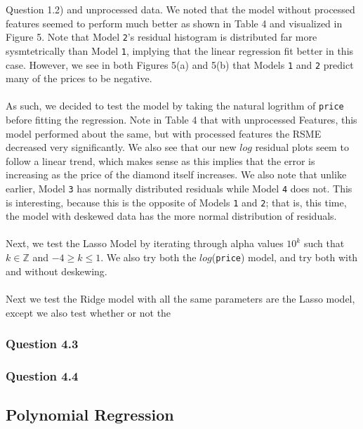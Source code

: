 \documentclass[11pt,letterpaper]{article}
\begin{document}
Question 1.2) and unprocessed data. We noted that the model without processed features
seemed to perform much better as shown in Table 4 and visualized in Figure 5. Note that
Model \texttt{2}'s residual histogram is distributed far more sysmtetrically than 
Model \texttt{1}, implying that the linear regression fit better in this case.
However, we see in both Figures 5(a) and 5(b) that Models \texttt{1} and \texttt{2} 
predict many of the prices to be negative. \\\\
As such, we decided to test the model by taking the natural logrithm of 
\texttt{price} before fitting the regression. Note in Table 4 that with unprocessed 
Features, this model performed about the same, but with processed features the RSME 
decreased very significantly. We also see that our new $log$ residual plots seem to 
follow a linear trend, which makes sense as this implies that the error is increasing
as the price of the diamond itself increases. We also note that unlike earlier, Model
\texttt{3} has normally distributed residuals while Model \texttt{4} does not. This is
interesting, because this is the opposite of Models \texttt{1} and \texttt{2}; that is,
this time, the model with deskewed data has the more normal distribution of residuals.\\\\

Next, we test the Lasso Model by iterating through alpha values $10^k$ such that 
$k\in \mathbb{Z}$ and $-4 \geq k \leq 1$. We also try both the $log$(\texttt{price})
model, and try both with and without deskewing. \\\\

Next we test the Ridge model with all the same parameters are the Lasso model, except
we also test whether or not the 





\subsubsection*{Question 4.3}
\subsubsection*{Question 4.4}

\subsection*{Polynomial Regression}
\end{document}
